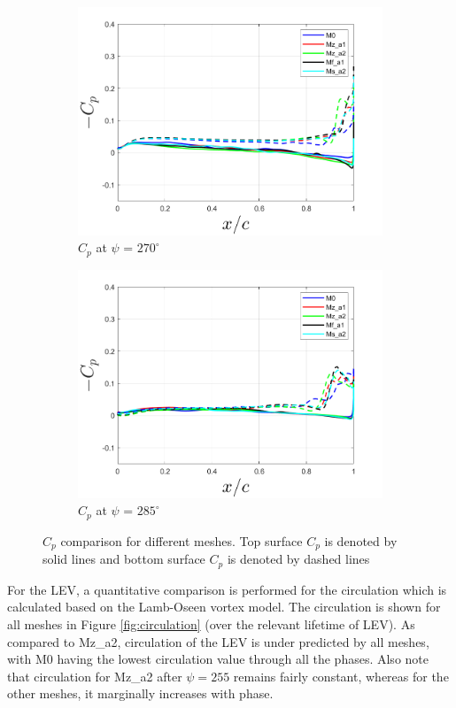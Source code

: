 \begin{figure}[H]
\begin{subfigure}[b]{0.475\textwidth}
\includegraphics[width=1\textwidth]{figures/Results/Cp_plots/Cp_ph_270.png}
\caption{ $C_p$ at $\psi$ = $270^\circ$}
\label{fig:Cp_270}
\end{subfigure}
\begin{subfigure}[b]{0.475\textwidth}
\centering
\includegraphics[width=1\textwidth]{figures/Results/Cp_plots/Cp_ph_285.png}
\caption{ $C_p$ at $\psi$ = $285^\circ$}
\label{fig:Cp_285}
\end{subfigure}
\caption{$C_p$ comparison for different meshes. Top surface $C_p$ is denoted by solid lines and bottom surface $C_p$ is denoted by dashed lines}
\label{fig:Cp_plots}
\end{figure}

For the LEV, a quantitative comparison is performed for the circulation which is calculated based on the Lamb-Oseen vortex model. The circulation is shown for all meshes in Figure \ref{fig:circulation} (over the relevant lifetime of LEV). As compared to Mz\_a2, circulation of the LEV is under predicted by all meshes, with M0 having the lowest circulation value through all the phases. Also note that circulation for Mz\_a2 after $\psi=255$ remains fairly constant, whereas for the other meshes, it marginally increases with phase. 

